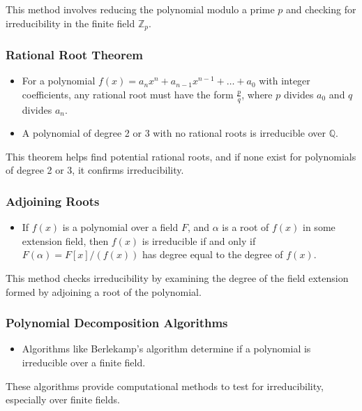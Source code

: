 This method involves reducing the polynomial modulo a prime $p$ and checking for irreducibility in the finite field $\mathbb{Z}_p$.

\subsubsection{Rational Root Theorem}

\begin{itemize}
	\item For a polynomial $f(x) = a_n x^n + a_{n-1} x^{n-1} + \dots + a_0$ with integer coefficients, any rational root must have the form $\frac{p}{q}$, where $p$ divides $a_0$ and $q$ divides $a_n$.
	\item A polynomial of degree 2 or 3 with no rational roots is irreducible over $\mathbb{Q}$.
\end{itemize}

This theorem helps find potential rational roots, and if none exist for polynomials of degree 2 or 3, it confirms irreducibility.

\subsubsection{Adjoining Roots}

\begin{itemize}
	\item If $f(x)$ is a polynomial over a field $F$, and $\alpha$ is a root of $f(x)$ in some extension field, then $f(x)$ is irreducible if and only if $F(\alpha) = F[x]/(f(x))$ has degree equal to the degree of $f(x)$.
\end{itemize}

This method checks irreducibility by examining the degree of the field extension formed by adjoining a root of the polynomial.

\subsubsection{Polynomial Decomposition Algorithms}

\begin{itemize}
	\item Algorithms like Berlekamp's algorithm determine if a polynomial is irreducible over a finite field.
\end{itemize}

These algorithms provide computational methods to test for irreducibility, especially over finite fields.

